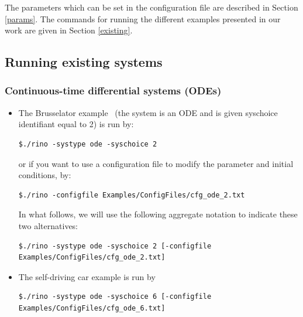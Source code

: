 \documentclass{article}
\begin{document}
The parameters which can be set in the configuration file are described in Section \ref{params}.  The commands for running the different examples presented in our work are given in Section \ref{existing}.


\subsection{Running existing systems \label{existing}}

\subsubsection{Continuous-time differential systems (ODEs)}

\begin{itemize}[noitemsep]
\item The Brusselator example~\cite{hscc2017} (the system is an ODE and is given syschoice identifiant equal to 2) is run by:
\begin{verbatim}
$./rino -systype ode -syschoice 2
\end{verbatim}
or if you want to use a configuration file to modify the parameter and initial conditions, by:
  \begin{verbatim}
$./rino -configfile Examples/ConfigFiles/cfg_ode_2.txt
\end{verbatim}
In what follows,  we will use the following aggregate notation to indicate these two alternatives:
  \begin{verbatim}
$./rino -systype ode -syschoice 2 [-configfile Examples/ConfigFiles/cfg_ode_2.txt]
\end{verbatim}
\item The self-driving car example \cite{hscc19}  is run by 
 \begin{verbatim}
$./rino -systype ode -syschoice 6 [-configfile Examples/ConfigFiles/cfg_ode_6.txt]
\end{verbatim}
  \end{itemize}
  
\end{document}
